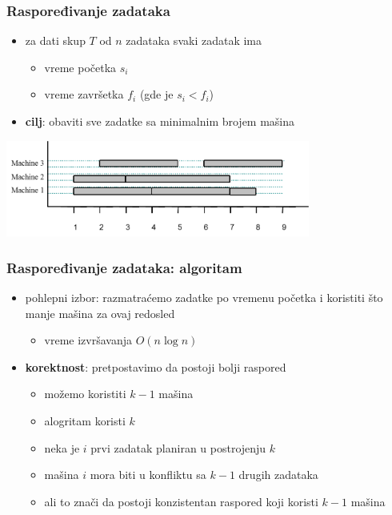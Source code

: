 \documentclass[compress]{beamer}
\begin{document}
\begin{frame}[fragile]
  \frametitle{Raspoređivanje zadataka}
  \begin{itemize}
    \item za dati skup $T$ od $n$ zadataka svaki zadatak ima
    \begin{itemize}
      \item vreme početka $s_{i}$
      \item vreme završetka $f_{i}$ (gde je $s_{i}<f_{i}$)
    \end{itemize}
    \item \textbf{cilj}: obaviti sve zadatke sa minimalnim brojem mašina
  \end{itemize}
  \begin{center}
    \includegraphics[width=10cm]{asp-13-pic17.png}
  \end{center}
\end{frame}

\begin{frame}[fragile]
  \frametitle{Raspoređivanje zadataka: algoritam}
  \begin{itemize}
    \item pohlepni izbor: razmatraćemo zadatke po vremenu početka i
    koristiti što manje mašina za ovaj redosled
    \begin{itemize}
      \item vreme izvršavanja $O(n\log n)$
    \end{itemize}
    \item \textbf{korektnost}: pretpostavimo da postoji bolji raspored
    \begin{itemize}
      \item možemo koristiti $k-1$ mašina
      \item alogritam koristi $k$
      \item neka je $i$ prvi zadatak planiran u postrojenju $k$
      \item mašina $i$ mora biti u konfliktu sa $k-1$ drugih zadataka
      \item ali to znači da postoji konzistentan raspored koji koristi
      $k-1$ mašina
    \end{itemize}
  \end{itemize}
\end{frame}
\end{document}
